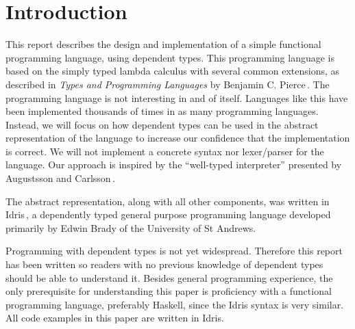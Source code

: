 \section{Introduction}
\label{sec:introduction}

This report describes the design and implementation of a simple functional programming language, using dependent types. This programming language is based on the simply typed lambda calculus with several common extensions, as described in \emph{Types and Programming Languages} by Benjamin C. Pierce\,\cite{Pierce:TypeSystems}. The programming language is not interesting in and of itself. Languages like this have been implemented thousands of times in as many programming languages. Instead, we will focus on how dependent types can be used in the abstract representation of the language to increase our confidence that the implementation is correct. We will not implement a concrete syntax nor lexer/parser for the language. Our approach is inspired by the ``well-typed interpreter'' presented by Augustsson and Carlsson\,\cite{Augustsson99anexercise}. 

The abstract representation, along with all other components, was written in Idris\,\cite{Idris}, a dependently typed general purpose programming language developed primarily by Edwin Brady of the University of St Andrews.  

Programming with dependent types is not yet widespread. Therefore this report has been written so readers with no previous knowledge of dependent types should be able to understand it. Besides general programming experience, the only prerequisite for understanding this paper is proficiency with a functional programming language, preferably Haskell, since the Idris syntax is very similar. All code examples in this paper are written in Idris.

